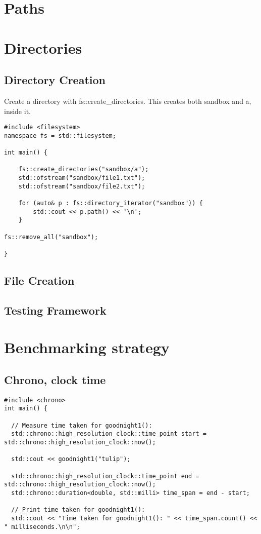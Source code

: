\section{Paths}

\section{Directories}

\subsection{Directory Creation}

Create a directory with fs::create\_directories. This creates both sandbox and a, inside it.

\begin{verbatim}
#include <filesystem>
namespace fs = std::filesystem;

int main() {

    fs::create_directories("sandbox/a");
    std::ofstream("sandbox/file1.txt");
    std::ofstream("sandbox/file2.txt");

    for (auto& p : fs::directory_iterator("sandbox")) {
        std::cout << p.path() << '\n';
    } 

fs::remove_all("sandbox");

}
\end{verbatim}


\subsection{File Creation}



\subsection{Testing Framework}

\section{Benchmarking strategy}
\subsection{Chrono, clock time}

\begin{verbatim}
#include <chrono>
int main() {

  // Measure time taken for goodnight1():
  std::chrono::high_resolution_clock::time_point start = std::chrono::high_resolution_clock::now();

  std::cout << goodnight1("tulip");

  std::chrono::high_resolution_clock::time_point end = std::chrono::high_resolution_clock::now();
  std::chrono::duration<double, std::milli> time_span = end - start;

  // Print time taken for goodnight1():
  std::cout << "Time taken for goodnight1(): " << time_span.count() << " milliseconds.\n\n";
\end{verbatim}

